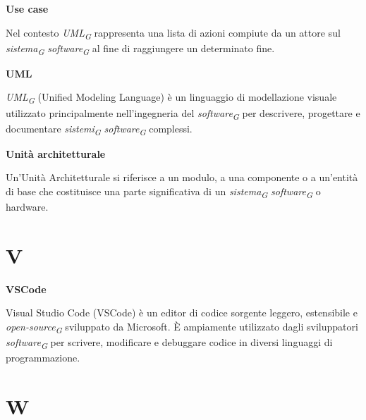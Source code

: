 \documentclass{article}
\begin{document}
\textbf{Use case}

\vspace{0.1cm}

Nel contesto \textit{UML}\textsubscript{\textit{G}} rappresenta una lista di azioni compiute da un attore sul \textit{sistema}\textsubscript{\textit{G}} \textit{software}\textsubscript{\textit{G}} al fine di raggiungere un determinato fine.

\vspace{0.4cm}

\textbf{UML}

\vspace{0.1cm}

\textit{UML}\textsubscript{\textit{G}} (Unified Modeling Language) è un linguaggio di modellazione visuale utilizzato principalmente nell'ingegneria del \textit{software}\textsubscript{\textit{G}} per descrivere, progettare e documentare \textit{sistemi}\textsubscript{\textit{G}} \textit{software}\textsubscript{\textit{G}} complessi.

\vspace{0.4cm}

\textbf{Unità architetturale}

\vspace{0.1cm}

Un'Unità Architetturale si riferisce a un modulo, a una componente o a un'entità di base che costituisce una parte significativa di un \textit{sistema}\textsubscript{\textit{G}} \textit{software}\textsubscript{\textit{G}} o hardware. 

\pagebreak
\section*{V}
{}

\vspace{0.4cm}

\textbf{VSCode}

\vspace{0.1cm}

Visual Studio Code (VSCode) è un editor di codice sorgente leggero, estensibile e \textit{open-source}\textsubscript{\textit{G}} sviluppato da Microsoft. È ampiamente utilizzato dagli sviluppatori \textit{software}\textsubscript{\textit{G}} per scrivere, modificare e debuggare codice in diversi linguaggi di programmazione.

\pagebreak
\section*{W}
{}
\end{document}
